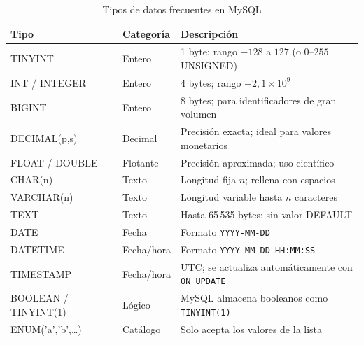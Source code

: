 \begin{table}[H]
  \centering
  \caption{Tipos de datos frecuentes en MySQL}
  \renewcommand{\arraystretch}{1.3}
  \begin{tabularx}{\textwidth}{>{\ttfamily}l l X}
    \toprule
    \textbf{Tipo}         & \textbf{Categoría} & \textbf{Descripción}                             \\
    \midrule
    TINYINT               & Entero    & 1 byte; rango $-128$ a $127$ (o $0$–$255$ UNSIGNED) \\
    INT / INTEGER         & Entero    & 4 bytes; rango $\pm2{,}1 \times 10^9$            \\
    BIGINT                & Entero    & 8 bytes; para identificadores de gran volumen    \\
    DECIMAL(p,s)          & Decimal   & Precisión exacta; ideal para valores monetarios  \\
    FLOAT / DOUBLE        & Flotante  & Precisión aproximada; uso científico             \\
    CHAR(n)               & Texto     & Longitud fija $n$; rellena con espacios          \\
    VARCHAR(n)            & Texto     & Longitud variable hasta $n$ caracteres           \\
    TEXT                  & Texto     & Hasta 65\,535 bytes; sin valor DEFAULT           \\
    DATE                  & Fecha     & Formato \texttt{YYYY-MM-DD}                      \\
    DATETIME              & Fecha/hora& Formato \texttt{YYYY-MM-DD HH:MM:SS}             \\
    TIMESTAMP             & Fecha/hora& UTC; se actualiza automáticamente con \texttt{ON UPDATE} \\
    BOOLEAN / TINYINT(1)  & Lógico    & MySQL almacena booleanos como \texttt{TINYINT(1)} \\
    ENUM('a','b',\ldots)  & Catálogo  & Solo acepta los valores de la lista              \\
    \bottomrule
  \end{tabularx}
\end{table}

